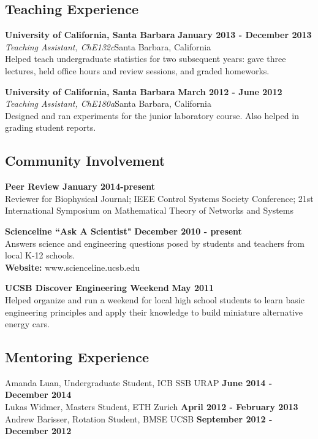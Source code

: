 {\subsection*{Teaching Experience}
{\bf University of California, Santa Barbara}  \hfill {\bf January 2013 -
  December 2013}\\
{\em Teaching Assistant, ChE132c}\hfill  Santa Barbara, California\\
Helped teach undergraduate statistics for two subsequent years: gave three
lectures, held office hours and review sessions, and graded homeworks.

{\bf University of California, Santa Barbara} \hfill {\bf March 2012 - June 2012}\\
{\em Teaching Assistant, ChE180a}\hfill  Santa Barbara, California\\
Designed and ran experiments for the junior laboratory course. Also helped in grading student reports.

\subsection*{Community Involvement}
{\bf Peer Review \hfill January 2014-present}\\
Reviewer for Biophysical Journal;  IEEE Control Systems Society Conference; 21st International Symposium on
Mathematical Theory of Networks and Systems

{\bf Scienceline ``Ask A Scientist"} \hfill {\bf December 2010 - present}\\
Answers science and engineering questions posed by students and teachers from local K-12 schools. \\
{\bfseries Website:} www.scienceline.ucsb.edu

{\bf UCSB Discover Engineering Weekend} \hfill {\bf May 2011}\\
Helped organize and run a weekend for local high school students to learn basic engineering principles and apply their knowledge to build miniature alternative energy cars.


\subsection*{Mentoring Experience}
Amanda Luan, Undergraduate Student, ICB SSB URAP \hfill {\bf June 2014 - December 2014} \\
Lukas Widmer, Masters Student, ETH Zurich \hfill {\bf April 2012 - February 2013} \\
Andrew Barisser, Rotation Student, BMSE UCSB \hfill {\bf September 2012 - December 2012}

}
